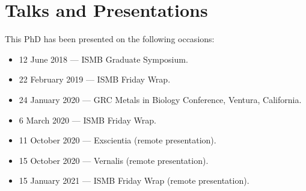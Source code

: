 \section{Talks and Presentations}

This PhD has been presented on the following occasions:

\begin{itemize}
  \item 12 June 2018 --- ISMB Graduate Symposium.
  \item 22 February 2019 --- ISMB Friday Wrap.
  \item 24 January 2020 --- GRC Metals in Biology Conference, Ventura, California.
  \item 6 March 2020 --- ISMB Friday Wrap.
  \item 11 October 2020 --- Exscientia (remote presentation).
  \item 15 October 2020 --- Vernalis (remote presentation).
  \item 15 January 2021 --- ISMB Friday Wrap (remote presentation).
\end{itemize}

